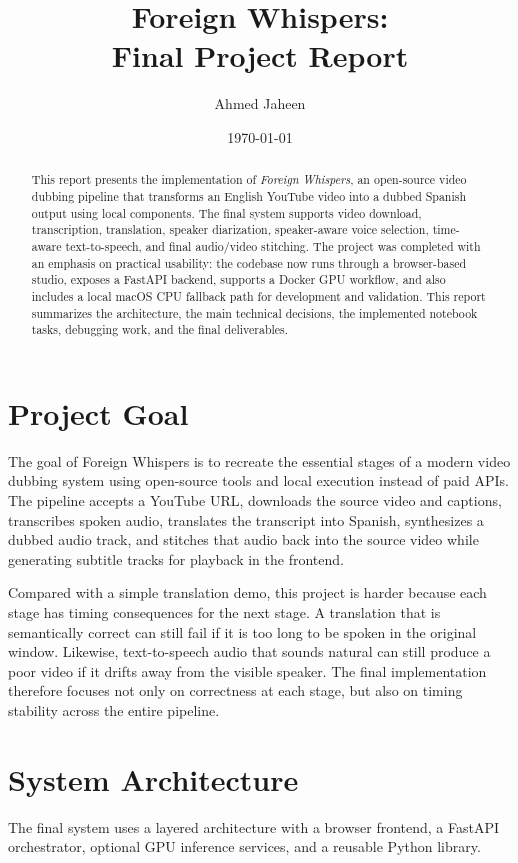 \documentclass[11pt]{article}
\title{Foreign Whispers:\\Final Project Report}
\author{Ahmed Jaheen}
\date{\today}
\begin{document}
\maketitle

\begin{abstract}
This report presents the implementation of \textit{Foreign Whispers}, an
open-source video dubbing pipeline that transforms an English YouTube video
into a dubbed Spanish output using local components. The final system supports
video download, transcription, translation, speaker diarization, speaker-aware
voice selection, time-aware text-to-speech, and final audio/video stitching.
The project was completed with an emphasis on practical usability: the codebase
now runs through a browser-based studio, exposes a FastAPI backend, supports a
Docker GPU workflow, and also includes a local macOS CPU fallback path for
development and validation. This report summarizes the architecture, the main
technical decisions, the implemented notebook tasks, debugging work, and the
final deliverables.
\end{abstract}

\section{Project Goal}
The goal of Foreign Whispers is to recreate the essential stages of a modern
video dubbing system using open-source tools and local execution instead of
paid APIs. The pipeline accepts a YouTube URL, downloads the source video and
captions, transcribes spoken audio, translates the transcript into Spanish,
synthesizes a dubbed audio track, and stitches that audio back into the source
video while generating subtitle tracks for playback in the frontend.

Compared with a simple translation demo, this project is harder because each
stage has timing consequences for the next stage. A translation that is
semantically correct can still fail if it is too long to be spoken in the
original window. Likewise, text-to-speech audio that sounds natural can still
produce a poor video if it drifts away from the visible speaker. The final
implementation therefore focuses not only on correctness at each stage, but
also on timing stability across the entire pipeline.

\section{System Architecture}
The final system uses a layered architecture with a browser frontend, a FastAPI
orchestrator, optional GPU inference services, and a reusable Python library.
\end{document}
